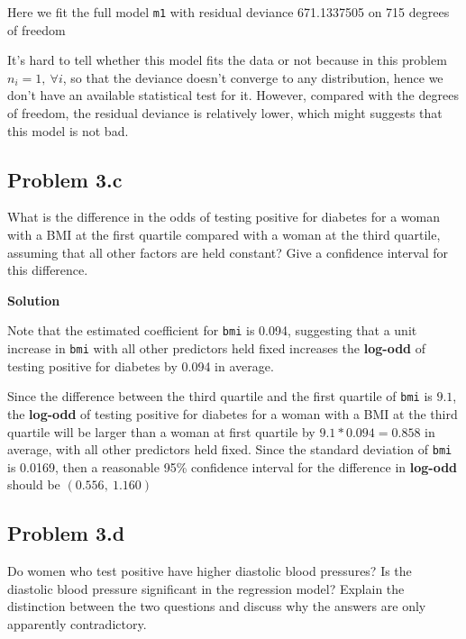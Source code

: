 \documentclass[12pt,oneside,a4paper]{article}\usepackage[]{graphicx}\usepackage[]{xcolor}
\newcommand{\subproblem}[1]
{
    \subsection*{Problem {#1}}
}
\newcommand{\solution}
{
    \vspace{15pt}
    \noindent\ignorespaces\textbf{\large Solution}\par
}
\newcommand{\m}[1]{\texttt{{#1}}}
\begin{document}
Here we fit the full model \m{m1} with residual deviance 671.1337505 on 715 degrees of freedom

It's hard to tell whether this model fits the data or not because in this problem $n_{i} = 1,~ \forall i$, so that the deviance doesn't converge to any distribution, hence we don't have an available statistical test for it. However, compared with the degrees of freedom, the residual deviance is relatively lower, which might suggests that this model is not bad.

\subproblem{3.c}
What is the difference in the odds of testing positive for diabetes for a woman with a BMI at the first quartile compared with a woman at the third quartile, assuming that all other factors are held constant? Give a confidence interval for this difference.

\solution
Note that the estimated coefficient for \m{bmi} is 0.094, suggesting that a unit increase in \m{bmi} with all other predictors held fixed increases the \textbf{log-odd} of testing positive for diabetes by 0.094 in average. 

Since the difference between the third quartile and the first quartile of \m{bmi} is $9.1$, the \textbf{log-odd} of testing positive for diabetes for a woman with a BMI at the third quartile will be larger than a woman at first quartile by $9.1 * 0.094 = 0.858$ in average, with all other predictors held fixed. Since the standard deviation of \m{bmi} is 0.0169, then a reasonable 95\% confidence interval for the difference in \textbf{log-odd} should be $(0.556, ~1.160)$

\subproblem{3.d}
Do women who test positive have higher diastolic blood pressures? Is the diastolic blood pressure significant in the regression model? Explain the distinction between the two questions and discuss why the answers are only apparently contradictory.
\end{document}
